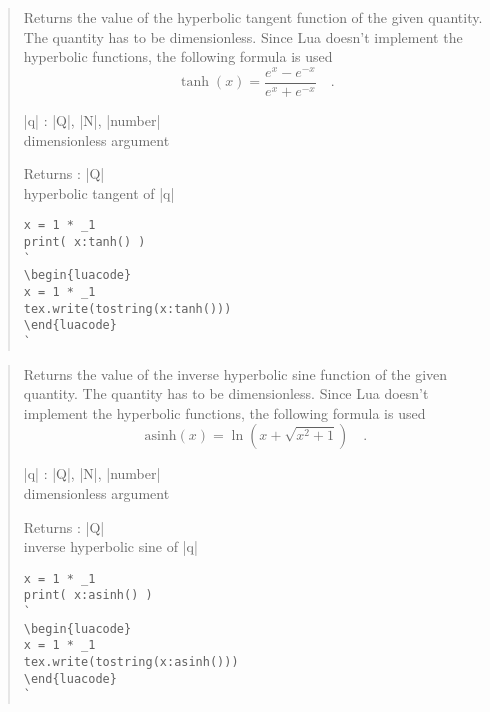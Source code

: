 \documentclass{ltxdoc}
\begin{document}
\begin{quote}
  Returns the value of the hyperbolic tangent function of the given quantity. The quantity has to be dimensionless. Since Lua doesn't implement the hyperbolic functions, the following formula is used 
  $$
    \tanh(x) = \frac{e^x - e^{-x}}{e^x + e^{-x}} \quad.
  $$

  \begin{description}
  \item |q| : |Q|, |N|, |number|\\
    dimensionless argument

  \item Returns : |Q|\\
    hyperbolic tangent of |q|
  \end{description}

\begin{lstlisting}
x = 1 * _1
print( x:tanh() )
`
\begin{luacode}
x = 1 * _1
tex.write(tostring(x:tanh()))
\end{luacode}
`
\end{lstlisting}

\end{quote}




\begin{quote}
  Returns the value of the inverse hyperbolic sine function of the given quantity. The quantity has to be dimensionless. Since Lua doesn't implement the hyperbolic functions, the following formula is used 
  $$
    \text{asinh}(x) = \ln\left( x + \sqrt{x^2 + 1} \right)  \quad.
  $$

  \begin{description}
  \item |q| : |Q|, |N|, |number|\\
    dimensionless argument

  \item Returns : |Q|\\
    inverse hyperbolic sine of |q|
  \end{description}


\begin{lstlisting}
x = 1 * _1
print( x:asinh() )
`
\begin{luacode}
x = 1 * _1
tex.write(tostring(x:asinh()))
\end{luacode}
`
\end{lstlisting}

\end{quote}
\end{document}
